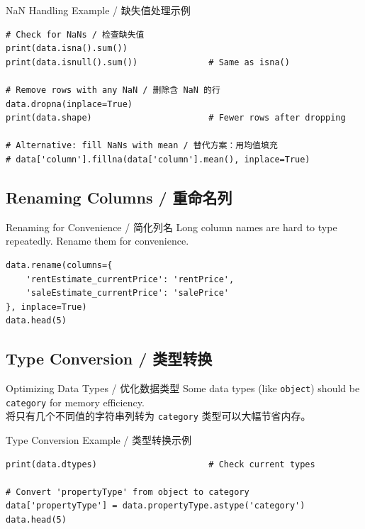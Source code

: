 \documentclass[11pt,a4paper]{article}
\begin{document}
\begin{examplebox}{NaN Handling Example / 缺失值处理示例}
\begin{lstlisting}
# Check for NaNs / 检查缺失值
print(data.isna().sum())
print(data.isnull().sum())              # Same as isna()

# Remove rows with any NaN / 删除含 NaN 的行
data.dropna(inplace=True)
print(data.shape)                       # Fewer rows after dropping

# Alternative: fill NaNs with mean / 替代方案：用均值填充
# data['column'].fillna(data['column'].mean(), inplace=True)
\end{lstlisting}
\end{examplebox}

\subsection{Renaming Columns / 重命名列}

\begin{examplebox}{Renaming for Convenience / 简化列名}
    Long column names are hard to type repeatedly. Rename them for convenience.
\begin{lstlisting}
data.rename(columns={
    'rentEstimate_currentPrice': 'rentPrice',
    'saleEstimate_currentPrice': 'salePrice'
}, inplace=True)
data.head(5)
\end{lstlisting}
\end{examplebox}

\subsection{Type Conversion / 类型转换}

\begin{concept}{Optimizing Data Types / 优化数据类型}
    Some data types (like \texttt{object}) should be \texttt{category} for memory efficiency. \\
    将只有几个不同值的字符串列转为 \texttt{category} 类型可以大幅节省内存。
\end{concept}

\begin{examplebox}{Type Conversion Example / 类型转换示例}
\begin{lstlisting}
print(data.dtypes)                      # Check current types

# Convert 'propertyType' from object to category
data['propertyType'] = data.propertyType.astype('category')
data.head(5)
\end{lstlisting}
\end{examplebox}
\end{document}
